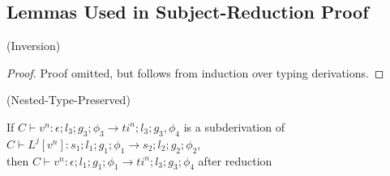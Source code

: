 \subsection{Lemmas Used in Subject-Reduction Proof}
\begin{lemma}{(Inversion)}
\end{lemma}
\begin{proof}
    Proof omitted, but follows from induction over typing derivations.
\end{proof}

\begin{lemma}{(Nested-Type-Preserved)}

    If $C \vdash v^n : \epsilon;l_3;g_3;\phi_3 \rightarrow ti^n;l_3;g_3,\phi_4$ is a subderivation of $C \vdash  L^j [v^n] : s_1;l_1;g_1;\phi_1 \rightarrow s_2;l_2;g_2;\phi_2$,
    \\then $C \vdash v^n : \epsilon;l_1;g_1;\phi_1 \rightarrow ti^n;l_3;g_3;\phi_4$ after reduction
\end{lemma}
